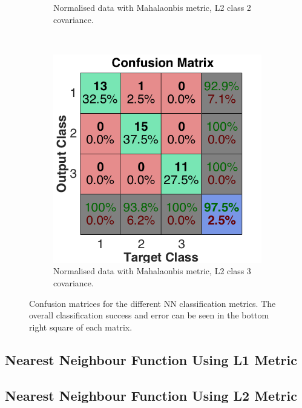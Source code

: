 \documentclass[a4paper, 10pt, conference]{ieeeconf}
\begin{document}
\begin{figure}[!ht]
\begin{subfigure}{0.32\textwidth}
      \caption{Normalised data with Mahalaonbis metric, L2 class 2 covariance.}
    \end{subfigure}
    ~
    \begin{subfigure}{0.32\textwidth}
      \includegraphics[width=\textwidth]{pic/mod_cov_l2_class3.png}
      \caption{Normalised data with Mahalaonbis metric, L2 class 3 covariance.}
    \end{subfigure}
	\caption{Confusion matrices for the different NN classification metrics. The overall classification success and error can be seen in the bottom right square of each matrix. }
  \label{fig:nnconfuse}
\end{figure}
\newpage

\subsection*{Nearest Neighbour Function Using L1 Metric}


\subsection*{Nearest Neighbour Function Using L2 Metric}

\newpage
\end{document}
